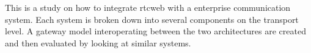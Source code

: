 
\begin{abstract}


\end{abstract}


This is a study on how to integrate \gls{rtcweb} with a enterprise communication system. Each system is broken down into several components on the transport level. A gateway model interoperating between the two architectures are created and then evaluated by looking at similar systems.

